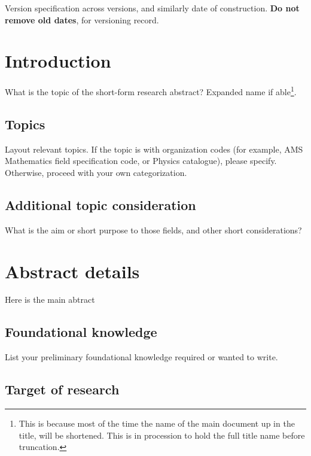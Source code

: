 \documentclass[10pt,a4paper]{article}
\begin{document}
Version specification across versions, and similarly date of construction. \textbf{Do not remove old dates}, for versioning record. 

\section{Introduction}

What is the topic of the short-form research abstract? Expanded name if able\footnote{This is because most of the time the name of the main document up in the title, will be shortened. This is in procession to hold the full title name before truncation.}.

\subsection{Topics}

Layout relevant topics. If the topic is with organization codes (for example, AMS Mathematics field specification code, or Physics catalogue), please specify. Otherwise, proceed with your own categorization. 

\subsection{Additional topic consideration}

What is the aim or short purpose to those fields, and other short considerations? 

\section{Abstract details}

Here is the main abtract

\subsection{Foundational knowledge}

List your preliminary foundational knowledge required or wanted to write. 

\subsection{Target of research}
\end{document}
